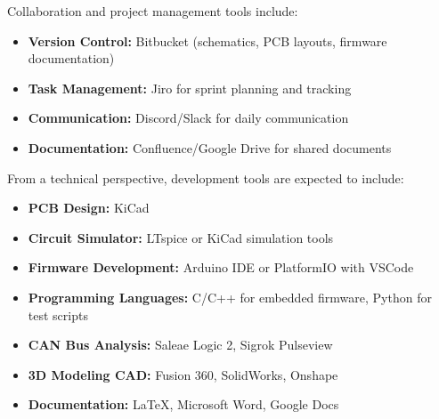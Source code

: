 Collaboration and project management tools include:
\begin{itemize}
	\item \textbf{Version Control:} Bitbucket (schematics, PCB layouts, firmware documentation)
	\item \textbf{Task Management:} Jiro for sprint planning and tracking
	\item \textbf{Communication:} Discord/Slack for daily communication
	\item \textbf{Documentation:} Confluence/Google Drive for shared documents
\end{itemize}

From a technical perspective, development tools are expected to include:
\begin{itemize}
	\item \textbf{PCB Design:} KiCad
	\item \textbf{Circuit Simulator:} LTspice or KiCad simulation tools
	\item \textbf{Firmware Development:} Arduino IDE or PlatformIO with VSCode
	\item \textbf{Programming Languages:} C/C++ for embedded firmware, Python for test scripts
	\item \textbf{CAN Bus Analysis:} Saleae Logic 2, Sigrok Pulseview
	\item \textbf{3D Modeling CAD:} Fusion 360, SolidWorks, Onshape
	\item \textbf{Documentation:} LaTeX, Microsoft Word, Google Docs
\end{itemize}